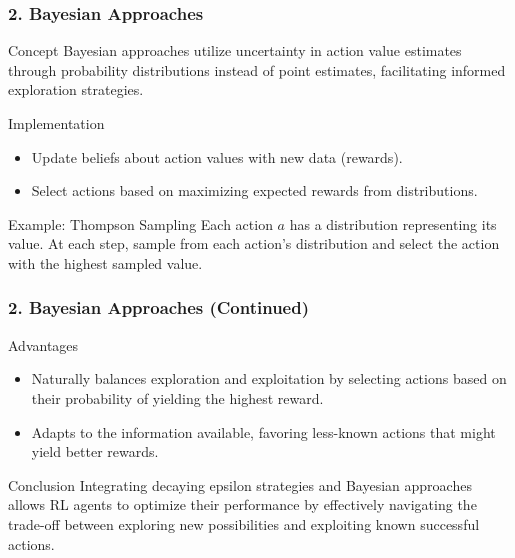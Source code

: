 \documentclass[aspectratio=169]{beamer}
\begin{document}
\begin{frame}[fragile]
    \frametitle{2. Bayesian Approaches}
    \begin{block}{Concept}
        Bayesian approaches utilize uncertainty in action value estimates through probability distributions instead of point estimates, facilitating informed exploration strategies.
    \end{block}

    \begin{block}{Implementation}
        \begin{itemize}
            \item Update beliefs about action values with new data (rewards).
            \item Select actions based on maximizing expected rewards from distributions.
        \end{itemize}
    \end{block}
    
    \begin{block}{Example: Thompson Sampling}
        Each action \( a \) has a distribution representing its value. At each step, sample from each action's distribution and select the action with the highest sampled value.
    \end{block}
\end{frame}

\begin{frame}[fragile]
    \frametitle{2. Bayesian Approaches (Continued)}
    \begin{block}{Advantages}
        \begin{itemize}
            \item Naturally balances exploration and exploitation by selecting actions based on their probability of yielding the highest reward.
            \item Adapts to the information available, favoring less-known actions that might yield better rewards.
        \end{itemize}
    \end{block}

    \begin{block}{Conclusion}
        Integrating decaying epsilon strategies and Bayesian approaches allows RL agents to optimize their performance by effectively navigating the trade-off between exploring new possibilities and exploiting known successful actions.
    \end{block}
\end{frame}
\end{document}
